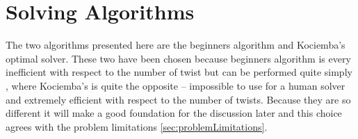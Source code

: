 \chapter{Solving Algorithms}
\label{cha:solvingAlgorithms}
The two algorithms presented here are the beginners algorithm and Kociemba's optimal solver.
These two have been chosen because beginners algorithm is every inefficient with respect to the number of twist but can be performed quite simply \cite{beginner}, where Kociemba's is quite the opposite -- impossible to use for a human solver and extremely efficient with respect to the number of twists.
Because they are so different it will make a good foundation for the discussion later and this choice agrees with the problem limitations \ref{sec:problemLimitations}.

	
	
	
